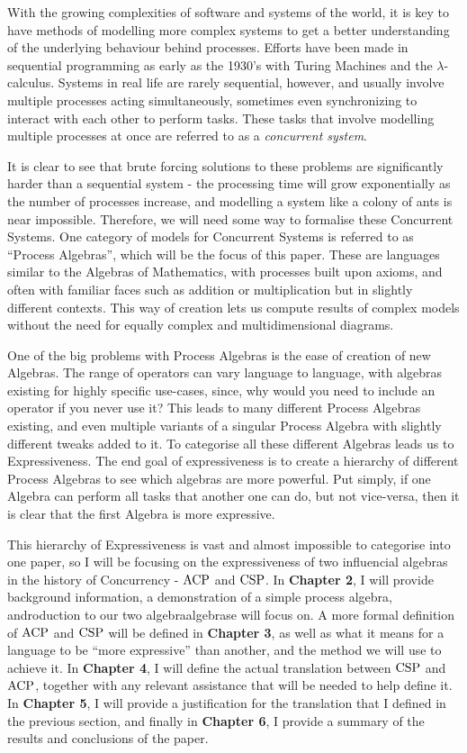 \documentclass[../hons_project.tex]{subfiles}
\begin{document}
With the growing complexities of software and systems of the world, it is key to have methods of modelling more complex systems to get a better understanding of the underlying behaviour behind processes. Efforts have been made in sequential programming as early as the 1930's with Turing Machines and the $\lambda$-calculus. Systems in real life are rarely sequential, however, and usually involve multiple processes acting simultaneously, sometimes even synchronizing to interact with each other to perform tasks. These tasks that involve modelling multiple processes at once are referred to as a \textit{ concurrent system}. 

It is clear to see that brute forcing solutions to these problems are significantly harder than a sequential system - the processing time will grow exponentially as the number of processes increase, and modelling a system like a colony of ants is near impossible. Therefore, we will need some way to formalise these Concurrent Systems. One category of models for Concurrent Systems is referred to as ``Process Algebras'', which will be the focus of this paper. These are languages similar to the Algebras of Mathematics, with processes built upon axioms, and often with familiar faces such as addition or multiplication but in slightly different contexts. This way of creation lets us compute results of complex models without the need for equally complex and multidimensional diagrams.

One of the big problems with Process Algebras is the ease of creation of new Algebras. The range of operators can vary language to language, with algebras existing for highly specific use-cases, since, why would you need to include an operator if you never use it? This leads to many different Process Algebras existing, and even multiple variants of a singular Process Algebra with slightly different tweaks added to it. To categorise all these different Algebras leads us to Expressiveness. The end goal of expressiveness is to create a hierarchy of different Process Algebras to see which algebras are more powerful. Put simply, if one Algebra can perform all tasks that another one can do, but not vice-versa, then it is clear that the first Algebra is more expressive.

This hierarchy of Expressiveness is vast and almost impossible to categorise into one paper, so I will be focusing on the expressiveness of two influencial algebras in the history of Concurrency - $\mathrm{ACP}$ and $\mathrm{CSP}$. In \textbf{Chapter 2}, I will provide background information, a demonstration of a simple process algebra, androduction to our two algebraalgebrase will focus on. A more formal definition of $\mathrm{ACP}$ and $\mathrm{CSP}$ will be defined in \textbf{Chapter 3}, as well as what it means for a language to be ``more expressive'' than another, and the method we will use to achieve it. In \textbf{Chapter 4}, I will define the actual translation between $\mathrm{CSP}$ and $\mathrm{ACP}$, together with any relevant assistance that will be needed to help define it. In \textbf{Chapter 5}, I will provide a justification for the translation that I defined in the previous section, and finally in \textbf{Chapter 6}, I provide a summary of the results and conclusions of the paper.
\end{document}
